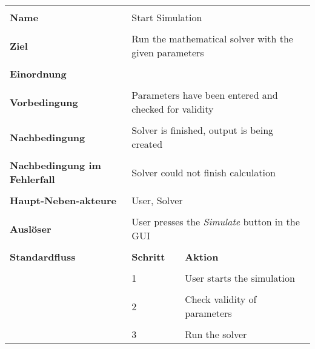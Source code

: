 {\begin{tabular}{|p{5cm}|p{2cm}|p{3cm}|}
\hline \\
\textbf{Name} & \multicolumn{2}{p{5cm}|}{Start Simulation} \\
\hline \\
\textbf{Ziel} & \multicolumn{2}{p{5cm}|}{Run the mathematical solver with the given parameters} \\
\hline \\
\textbf{Einordnung} & \multicolumn{2}{p{5cm}|}{} \\
\hline \\
\textbf{Vorbedingung} & \multicolumn{2}{p{5cm}|}{Parameters have been entered and checked for validity} \\
\hline \\
\textbf{Nachbedingung} & \multicolumn{2}{p{5cm}|}{Solver is finished, output is being created} \\
\hline \\
\textbf{Nachbedingung im Fehlerfall} & \multicolumn{2}{p{5cm}|}{Solver could not finish calculation}\\
\hline \\
\textbf{Haupt-Neben-akteure} & \multicolumn{2}{p{5cm}|}{User, Solver} \\
\hline \\
\textbf{Ausl\"oser} & \multicolumn{2}{p{5cm}|}{User presses the \textit{Simulate} button in the GUI} \\
\hline \\
\textbf{Standardfluss} & \textbf{Schritt}& \textbf{Aktion} \\
\hline \\
& 1 & User starts the simulation\\
\hline \\
& 2 & Check validity of parameters \\
\hline \\
& 3 & Run the solver\\
\hline
\end{tabular}

}
